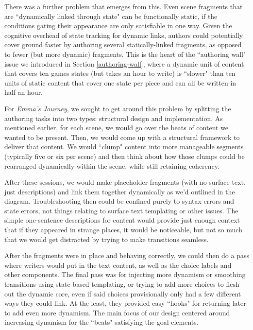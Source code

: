 There was a further problem that emerges from this. Even scene fragments that are ``dynamically linked through state" can be functionally static, if the conditions gating their appearance are only satisfiable in one way. Given the cognitive overhead of state tracking for dynamic links, authors could potentially cover ground faster by authoring several statically-linked fragments, as opposed to fewer (but more dynamic) fragments. This is the heart of the ``authoring wall" issue we introduced in Section \ref{authoring-wall}, where a dynamic unit of content that covers ten games states (but takes an hour to write) is ``slower" than ten units of static content that cover one state per piece and can all be written in half an hour.

For \textit{Emma's Journey}, we sought to get around this problem by splitting the authoring tasks into two types: structural design and implementation. As mentioned earlier, for each scene, we would go over the beats of content we wanted to be present. Then, we would come up with a structural framework to deliver that content. We would ``clump" content into more manageable segments (typically five or six per scene) and then think about how those clumps could be rearranged dynamically within the scene, while still retaining coherency.

After these sessions, we would make placeholder fragments (with no surface text, just descriptions) and link them together dynamically as we'd outlined in the diagram. Troubleshooting then could be confined purely to syntax errors and state errors, not things relating to surface text templating or other issues. The simple one-sentence descriptions for content would provide just enough context that if they appeared in strange places, it would be noticeable, but not so much that we would get distracted by trying to make transitions seamless.

After the fragments were in place and behaving correctly, we could then do a pass where writers would put in the text content, as well as the choice labels and other components. The final pass was for injecting more dynamism or smoothing transitions using state-based templating, or trying to add more choices to flesh out the dynamic core, even if said choices provisionally only had a few different ways they could link. At the least, they provided easy ``hooks" for returning later to add even more dynamism. The main focus of our design centered around increasing dynamism for the ``beats" satisfying the goal elements.

